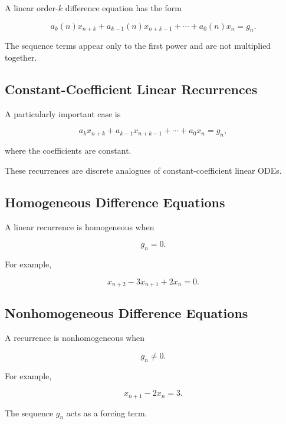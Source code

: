 A linear order-\(k\) difference equation has the form

\[
\boxed{
a_k(n)x_{n+k}
+
a_{k-1}(n)x_{n+k-1}
+
\cdots
+
a_0(n)x_n
=
g_n.
}
\]

The sequence terms appear only to the first power and are not multiplied
together.

\subsection{Constant-Coefficient Linear Recurrences}
\label{subsec:constant-coefficient-recurrences}

A particularly important case is

\[
\boxed{
a_kx_{n+k}
+
a_{k-1}x_{n+k-1}
+
\cdots
+
a_0x_n
=
g_n,
}
\]

where the coefficients are constant.

These recurrences are discrete analogues of constant-coefficient linear
ODEs.

\subsection{Homogeneous Difference Equations}
\label{subsec:homogeneous-difference-equations}

A linear recurrence is homogeneous when

\[
\boxed{
g_n=0.
}
\]

For example,

\[
\boxed{
x_{n+2}
-
3x_{n+1}
+
2x_n
=
0.
}
\]

\subsection{Nonhomogeneous Difference Equations}
\label{subsec:nonhomogeneous-difference-equations}

A recurrence is nonhomogeneous when

\[
\boxed{
g_n\neq0.
}
\]

For example,

\[
\boxed{
x_{n+1}
-
2x_n
=
3.
}
\]

The sequence \(g_n\) acts as a forcing term.

